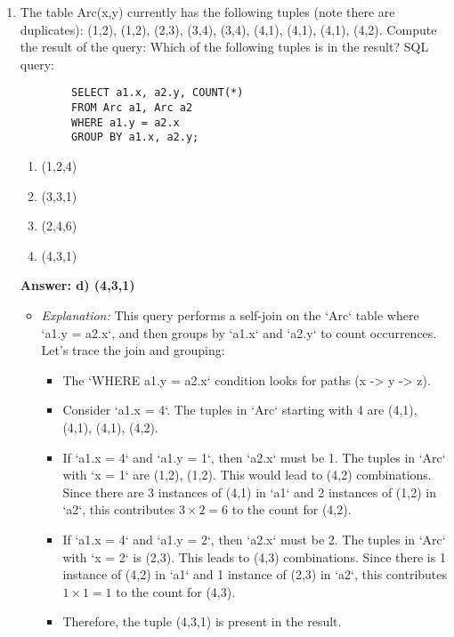 \documentclass{article}
\begin{document}
\begin{enumerate}[label=\textbf{Question \arabic*.}]
    \item The table Arc(x,y) currently has the following tuples (note there are duplicates): (1,2), (1,2), (2,3), (3,4), (3,4), (4,1), (4,1), (4,1), (4,2). Compute the result of the query: Which of the following tuples is in the result?
        SQL query:
        \begin{verbatim}
        SELECT a1.x, a2.y, COUNT(*)
        FROM Arc a1, Arc a2
        WHERE a1.y = a2.x
        GROUP BY a1.x, a2.y;
        \end{verbatim}
        \begin{enumerate}[label=\alph*)]
            \item (1,2,4)
            \item (3,3,1)
            \item (2,4,6)
            \item (4,3,1)
        \end{enumerate}
        \textbf{Answer: d) (4,3,1)}
        \begin{itemize}
            \item \textit{Explanation:} This query performs a self-join on the `Arc` table where `a1.y = a2.x`, and then groups by `a1.x` and `a2.y` to count occurrences. Let's trace the join and grouping:
            \begin{itemize}
                \item The `WHERE a1.y = a2.x` condition looks for paths (x -> y -> z).
                \item Consider `a1.x = 4`. The tuples in `Arc` starting with 4 are (4,1), (4,1), (4,1), (4,2).
                \item If `a1.x = 4` and `a1.y = 1`, then `a2.x` must be 1. The tuples in `Arc` with `x = 1` are (1,2), (1,2). This would lead to (4,2) combinations. Since there are 3 instances of (4,1) in `a1` and 2 instances of (1,2) in `a2`, this contributes $3 \times 2 = 6$ to the count for (4,2).
                \item If `a1.x = 4` and `a1.y = 2`, then `a2.x` must be 2. The tuples in `Arc` with `x = 2` is (2,3). This leads to (4,3) combinations. Since there is 1 instance of (4,2) in `a1` and 1 instance of (2,3) in `a2`, this contributes $1 \times 1 = 1$ to the count for (4,3).
                \item Therefore, the tuple (4,3,1) is present in the result.
            \end{itemize}
        \end{itemize}
    

\end{enumerate}
\end{document}
